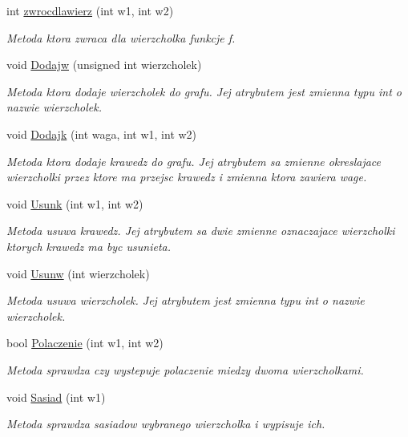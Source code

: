 \begin{DoxyCompactItemize}
int \hyperlink{class_graf_a22163f8368f0231f61c188bb867fddaa}{zwrocdlawierz} (int w1, int w2)
\begin{DoxyCompactList}\small\item\em Metoda ktora zwraca dla wierzcholka funkcje f. \end{DoxyCompactList}\item 
void \hyperlink{class_graf_a924085191a51a6f0afbab7075f26eae3}{Dodajw} (unsigned int wierzcholek)
\begin{DoxyCompactList}\small\item\em Metoda ktora dodaje wierzcholek do grafu. Jej atrybutem jest zmienna typu int o nazwie wierzcholek. \end{DoxyCompactList}\item 
void \hyperlink{class_graf_a462c9d3d65e85fbee8e16bbeb7110803}{Dodajk} (int waga, int w1, int w2)
\begin{DoxyCompactList}\small\item\em Metoda ktora dodaje krawedz do grafu. Jej atrybutem sa zmienne okreslajace wierzcholki przez ktore ma przejsc krawedz i zmienna ktora zawiera wage. \end{DoxyCompactList}\item 
void \hyperlink{class_graf_a989e232821c5f0fa37d993168d56be6f}{Usunk} (int w1, int w2)
\begin{DoxyCompactList}\small\item\em Metoda usuwa krawedz. Jej atrybutem sa dwie zmienne oznaczajace wierzcholki ktorych krawedz ma byc usunieta. \end{DoxyCompactList}\item 
void \hyperlink{class_graf_a9c8c9ffa7ad533e0b5ab71d9addbaab5}{Usunw} (int wierzcholek)
\begin{DoxyCompactList}\small\item\em Metoda usuwa wierzcholek. Jej atrybutem jest zmienna typu int o nazwie wierzcholek. \end{DoxyCompactList}\item 
bool \hyperlink{class_graf_aa153595415bd8bec9bc26bd8fb521492}{Polaczenie} (int w1, int w2)
\begin{DoxyCompactList}\small\item\em Metoda sprawdza czy wystepuje polaczenie miedzy dwoma wierzcholkami. \end{DoxyCompactList}\item 
void \hyperlink{class_graf_a5c5e84172e32e1e0564c931fcb3f7088}{Sasiad} (int w1)
\begin{DoxyCompactList}\small\item\em Metoda sprawdza sasiadow wybranego wierzcholka i wypisuje ich. \end{DoxyCompactList}\item 

\end{DoxyCompactItemize}
